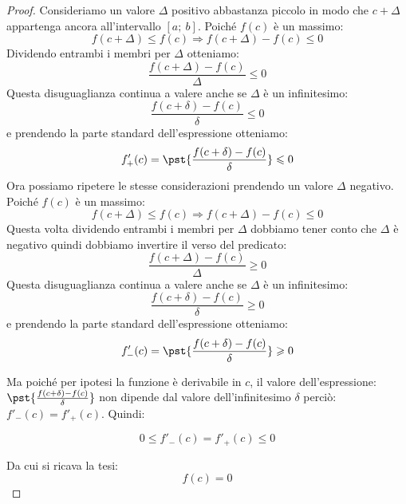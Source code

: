 \begin{proof}
Consideriamo un valore \(\Delta\) positivo abbastanza piccolo 
in modo che \(c+\Delta\) appartenga ancora all'intervallo \([a;~b]\).
Poiché \(f(c)\) è un massimo: 
\[f(c+\Delta) \leqslant f(c) \Rightarrow f(c+\Delta) - f(c) \leqslant 0\]
Dividendo entrambi i membri per \(\Delta\) otteniamo:
\[\frac{f(c+\Delta) - f(c)}{\Delta} \leqslant 0\]
Questa disuguaglianza continua a valere anche se \(\Delta\) è un infinitesimo:
\[\frac{f(c+\delta) - f(c)}{\delta} \leqslant 0\] 
e prendendo la parte standard dell'espressione otteniamo:
\[f'_+(c)=\pst{\frac{f(c+\delta) - f(c)}{\delta}} \leqslant 0\] 
Ora possiamo ripetere le stesse considerazioni prendendo un valore \(\Delta\) 
negativo.
Poiché \(f(c)\) è un massimo: 
\[f(c+\Delta) \leqslant f(c) \Rightarrow f(c+\Delta) - f(c) \leqslant 0\]
Questa volta dividendo entrambi i membri per \(\Delta\) dobbiamo tener conto 
che \(\Delta\) è negativo quindi dobbiamo invertire il verso del predicato:
\[\frac{f(c+\Delta) - f(c)}{\Delta} \geqslant 0\]
Questa disuguaglianza continua a valere anche se \(\Delta\) è un infinitesimo:
\[\frac{f(c+\delta) - f(c)}{\delta} \geqslant 0\] 
e prendendo la parte standard dell'espressione otteniamo:
\[f'_-(c)=\pst{\frac{f(c+\delta) - f(c)}{\delta}} \geqslant 0\] 

Ma poiché per ipotesi la funzione è derivabile in \(c\), il valore 
dell'espressione: \(\pst{\frac{f(c+\delta) - f(c)}{\delta}}\) non dipende dal 
valore dell'infinitesimo \(\delta\) perciò: \(f'_-(c) = f'_+(c)\). 
Quindi:

\[0 \leqslant f'_-(c) = f'_+(c) \leqslant 0\]

Da cui si ricava la tesi:
\[f(c) = 0\]

\end{proof}

% 
% 
% 

